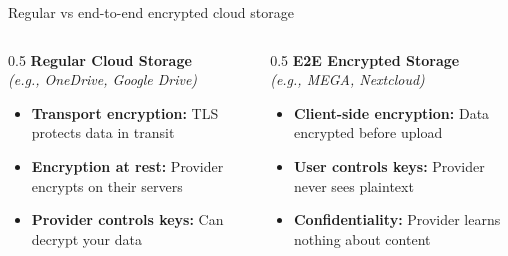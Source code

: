 \ifdefined\PRESENTATION\else\PassOptionsToClass{handout}{beamer}\fi\documentclass[aspectratio=169, lualatex]{beamer}
\begin{document}
\begin{frame}{Regular vs end-to-end encrypted cloud storage}
	\begin{columns}
		\begin{column}{0.5\textwidth}
			\textbf{Regular Cloud Storage}\\
			\textit{(e.g., OneDrive, Google Drive)}
			\vspace{0.5cm}
			\begin{itemize}[<+->]
				\item \textbf{Transport encryption:} TLS protects data in transit
				\item \textbf{Encryption at rest:} Provider encrypts on their servers
				\item \textbf{Provider controls keys:} Can decrypt your data
			\end{itemize}
		\end{column}
		\begin{column}{0.5\textwidth}
			\textbf{E2E Encrypted Storage}\\
			\textit{(e.g., MEGA, Nextcloud)}
			\vspace{0.5cm}
			\begin{itemize}[<+->]
				\item \textbf{Client-side encryption:} Data encrypted before upload
				\item \textbf{User controls keys:} Provider never sees plaintext
				\item \textbf{Confidentiality:} Provider learns nothing about content
			\end{itemize}
		\end{column}
	\end{columns}
\end{frame}
\end{document}
